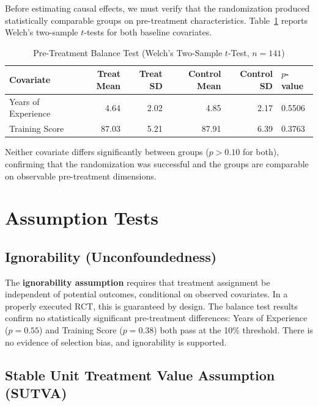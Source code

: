 \documentclass[12pt]{article}
\begin{document}
Before estimating causal effects, we must verify that the randomization produced
statistically comparable groups on pre-treatment characteristics. Table~\ref{tab:balance}
reports Welch's two-sample $t$-tests for both baseline covariates.

\begin{table}[H]
\centering
\caption{Pre-Treatment Balance Test (Welch's Two-Sample $t$-Test, $n = 141$)}
\label{tab:balance}
\begin{tabular}{lrrrrl}
\toprule
\textbf{Covariate} & \textbf{Treat Mean} & \textbf{Treat SD}
    & \textbf{Control Mean} & \textbf{Control SD} & \textbf{$p$-value} \\
\midrule
Years of Experience & 4.64 & 2.02 & 4.85 & 2.17 & 0.5506 \\
Training Score      & 87.03 & 5.21 & 87.91 & 6.39 & 0.3763 \\
\bottomrule
\end{tabular}
\end{table}

Neither covariate differs significantly between groups ($p > 0.10$ for both),
confirming that the randomization was successful and the groups are comparable
on observable pre-treatment dimensions.

\section{Assumption Tests}

\subsection{Ignorability (Unconfoundedness)}

The \textbf{ignorability assumption} requires that treatment assignment be independent
of potential outcomes, conditional on observed covariates. In a properly executed RCT,
this is guaranteed by design. The balance test results confirm no statistically
significant pre-treatment differences: Years of Experience ($p = 0.55$) and Training
Score ($p = 0.38$) both pass at the 10\% threshold. There is no evidence of selection
bias, and ignorability is supported.

\subsection{Stable Unit Treatment Value Assumption (SUTVA)}
\end{document}
